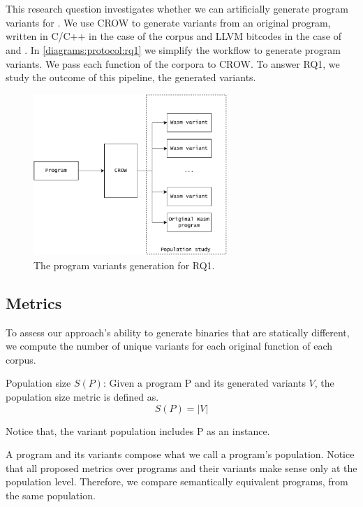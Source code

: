 
\section{\rqone}
\label{rq1:method}
This research question investigates whether we can artificially generate program variants for \wasm. We use CROW to generate variants from an original program, written in C/C++ in the case of the \corpusrosetta corpus and LLVM bitcodes in the case of \corpussodium and \corpusqrcode. 
In \autoref{diagrams:protocol:rq1} we simplify the workflow to generate \wasm program variants. We pass each function of the corpora to CROW. To answer RQ1, we study the outcome of this pipeline, the generated variants. 


\begin{figure}[h]
    \centering
    \includegraphics[height=2.4in]{diagrams/Rq1.pdf}
    \caption{The program variants generation for RQ1.}
    \label{diagrams:protocol:rq1}
\end{figure}


\subsection*{Metrics}

To assess our approach's ability to generate \wasm binaries that are statically different, we compute the number of unique variants for each original function of each corpus. 

\begin{metric}{Population size $S(P)$:}\label{metric:md5sum}
    Given a program P and its generated variants $V$, the population size metric is defined as.\\
    $$
        S(P)=|V|
    $$

    Notice that, the variant population includes P as an instance.
\end{metric}

A program and its variants compose what we call a program's population. Notice that all proposed metrics over programs and their variants make sense only at the population level. Therefore, we compare semantically equivalent programs, from the same population.

